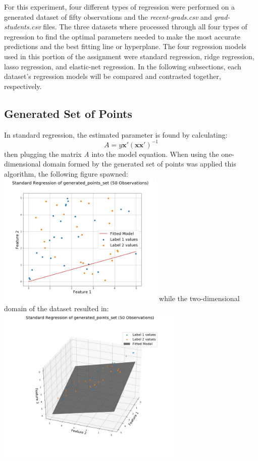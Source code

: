 \documentclass[a4paper,12pt]{IEEEtran}
\begin{document}
For this experiment, four different types of regression were performed on a generated dataset of fifty observations and the \textit{recent-grads.csv} and \textit{grad-students.csv} files. The three datasets where processed through all four types of regression to find the optimal parameters needed to make the most accurate predictions and the best fitting line or hyperplane. The four regression models used in this portion of the assignment were standard regression, ridge regression, lasso regression, and elastic-net regression. In the following subsections, each dataset's regression models will be compared and contrasted together, respectively.

\subsection{Generated Set of Points}
\label{gen_set}
In standard regression, the estimated parameter is found by calculating: \[\textit{A} = \textit{y}\textbf{x}'(\textbf{x}\textbf{x}')^{-1}\] then plugging the matrix \textit{A} into the model equation. When using the one-dimensional domain formed by the generated set of points was applied this algorithm, the following figure spawned:\includegraphics[width=8cm]{std_reg_1d_generated_points_set} while the two-dimensional domain of the dataset resulted in: \includegraphics[width=9cm]{std_reg_2d_generated_points_set}
\end{document}
